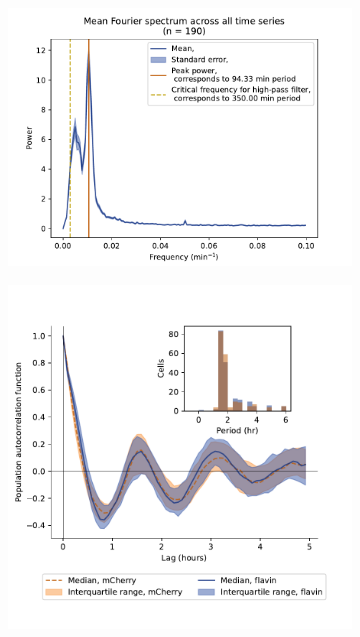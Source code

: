 \begin{figure}[b!]
  \centering
  \begin{subfigure}[htpb]{0.45\textwidth}
   \centering
   \includegraphics[width=\textwidth]{htb2mCherry_26643_14}
   \caption{
   }
   \label{fig:biology-highglc-sync-fourier}
  \end{subfigure}%
  \begin{subfigure}[htpb]{0.45\textwidth}
   \centering
   \includegraphics[width=\textwidth]{htb2mCherry_26643_12}
   \caption{
   }
   \label{fig:biology-highglc-sync-acf}
  \end{subfigure}


\end{figure}
